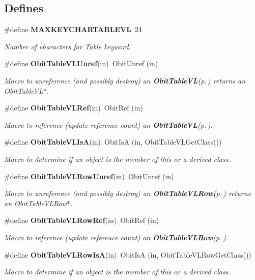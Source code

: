 \subsection*{Defines}
\begin{CompactItemize}
\item 
\#define {\bf MAXKEYCHARTABLEVL}\ 24
\begin{CompactList}\small\item\em Number of characters for Table keyword. \item\end{CompactList}\item 
\#define {\bf Obit\-Table\-VLUnref}(in)\ Obit\-Unref (in)
\begin{CompactList}\small\item\em Macro to unreference (and possibly destroy) an {\bf Obit\-Table\-VL}{\rm (p.\,\pageref{structObitTableVL})} returns an Obit\-Table\-VL$\ast$. \item\end{CompactList}\item 
\#define {\bf Obit\-Table\-VLRef}(in)\ Obit\-Ref (in)
\begin{CompactList}\small\item\em Macro to reference (update reference count) an {\bf Obit\-Table\-VL}{\rm (p.\,\pageref{structObitTableVL})}. \item\end{CompactList}\item 
\#define {\bf Obit\-Table\-VLIs\-A}(in)\ Obit\-Is\-A (in, Obit\-Table\-VLGet\-Class())
\begin{CompactList}\small\item\em Macro to determine if an object is the member of this or a derived class. \item\end{CompactList}\item 
\#define {\bf Obit\-Table\-VLRow\-Unref}(in)\ Obit\-Unref (in)
\begin{CompactList}\small\item\em Macro to unreference (and possibly destroy) an {\bf Obit\-Table\-VLRow}{\rm (p.\,\pageref{structObitTableVLRow})} returns an Obit\-Table\-VLRow$\ast$. \item\end{CompactList}\item 
\#define {\bf Obit\-Table\-VLRow\-Ref}(in)\ Obit\-Ref (in)
\begin{CompactList}\small\item\em Macro to reference (update reference count) an {\bf Obit\-Table\-VLRow}{\rm (p.\,\pageref{structObitTableVLRow})}. \item\end{CompactList}\item 
\#define {\bf Obit\-Table\-VLRow\-Is\-A}(in)\ Obit\-Is\-A (in, Obit\-Table\-VLRow\-Get\-Class())
\begin{CompactList}\small\item\em Macro to determine if an object is the member of this or a derived class. \item\end{CompactList}\end{CompactItemize}
